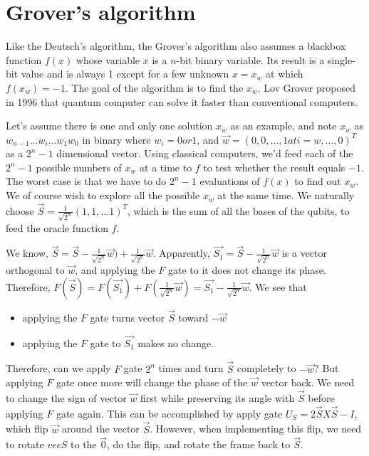 \documentclass[Letter,11pt]{book}
\begin{document}
\section{Grover's algorithm}
Like the Deutsch's algorithm, the Grover's algorithm also assumes a blackbox function $f(x)$ whose variable $x$ is a $n$-bit binary variable. Its result is a single-bit value and is always 1 except for a few unknown $x=x_w$ at which $f(x_w)=-1$. The goal of the algorithm is to find the $x_w$. Lov Grover proposed in 1996 that quantum computer can solve it faster than conventional computers.

Let's assume there is one and only one solution $x_w$ as an example, and note $x_w$ as $w_{n-1}...w_i...w_1 w_0$ in binary where $w_i = 0 or 1$, and $\Vec{w} = (0, 0, ..., 1 at i=w, ..., 0)^T$ as a $2^n-1$ dimensional vector. Using classical computers, we'd feed each of the $2^n -1$ possible numbers of $x_w$ at a time to $f$ to test whether the result equals $-1$. The worst case is that we have to do $2^n-1$ evaluations of $f(x)$ to find out $x_w$. We of course wish to explore all the possible $x_w$ at the same time. We naturally choose $\vec{S} = \frac 1 {\sqrt{2^n}} (1, 1, ...1)^T$, which is the sum of all the bases of the qubits, to feed the oracle function $f$.

We know, $\vec{S} = \vec{S} - \frac 1 {\sqrt{2^n}} \vec{w}) + \frac 1  {\sqrt{2^n}} \vec{w}$. Apparently, $\vec{S_1}  = \vec{S} - \frac 1 {\sqrt{2^n}} \vec{w}$ is a vector orthogonal to $\vec{w}$, and applying the $F$ gate to it does not change its phase. Therefore, $F(\vec{S}) = F(\vec{S_1}) + F(\frac 1  {\sqrt{2^n}} \vec{w})  = \vec{S_1} - \frac 1 {\sqrt{2^n}} \vec{w}$. We see that 
\begin{itemize}
    \item applying the $F$ gate turns vector $\vec{S}$ toward $-\vec{w}$
    \item applying the $F$ gate to $\vec{S_1}$ makes no change.
\end{itemize}
Therefore, can we apply $F$ gate $2^n$ times and turn $\vec{S}$ completely to $-\vec{w}$? But applying $F$ gate once more will change the phase of the $\vec{w}$ vector back. We need to change the sign of vector $\vec{w}$ first while preserving its angle with $\vec{S}$ before applying $F$ gate again. This can be accomplished by apply gate $U_S = 2 \vec{S}X\vec{S} -I$, which flip $\vec{w}$ around the vector $\vec{S}$. However, when implementing this flip, we need to rotate $vec{S}$ to the $\vec{0}$, do the flip, and rotate the frame back to $\vec{S}$.
\end{document}
